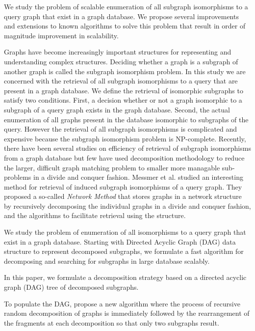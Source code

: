 We study the problem of scalable enumeration of all subgraph isomorphisms to a query graph that exist in a graph database. We  propose several improvements and extensions to known algorithms to solve this problem that result in order of magnitude improvement in scalability. 

Graphs have become increasingly important structures for representing and understanding complex structures. Deciding whether a graph is a subgraph of another graph is called the subgraph isomorphism problem. In this study we are concerned with the retrieval of all subgraph isomorphisms to a query that are present in a graph database.
We define the retrieval of isomorphic subgraphs to satisfy two conditions.  First, a decision whether or not a graph isomorphic to a subgraph of a query graph exists in the graph database. Second, the actual enumeration of all graphs present in the database isomorphic to subgraphs of the query. However the retrieval of all subgraph isomorphisms is complicated and expensive because the subgraph isomorphism problem is NP-complete.
Recently, there have been several studies on efficiency of retrieval of subgraph isomorphisms from a graph database but few have used decomposition methodology to reduce the larger, difficult graph matching problem to smaller more managable sub-problems in a divide and conquer fashion. Messmer et al. studied an interesting method for retrieval of induced subgraph isomorphisms of a query graph. They proposed a so-called \textit{Network Method} that stores graphs  in a network structure  by recursively decomposing the individual graphs in a divide and conquer fashion, and the algorithms to facilitate retrieval using the structure.


We study the problem of enumeration of all isomorphisms to a query graph that exist in a graph database. Starting with Directed Acyclic Graph (DAG) data structure to represent decomposed subgraphs,  we formulate a fast algorithm for decomposing and searching for subgraphs in large database scalably.

In this paper, we formulate a decomposition strategy based on a directed acyclic graph (DAG) tree of decomposed subgraphs. 

To populate the DAG, propose a new algorithm where the process of recursive random decomposition of graphs is immediately followed by the rearrangement of the fragments at each decomposition so that only two subgraphs result.

